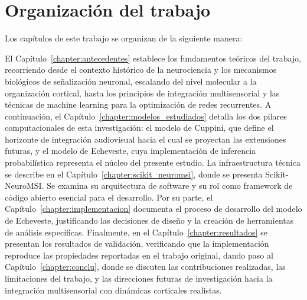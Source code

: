 
\section{Organización del trabajo}

Los capítulos de este trabajo se organizan de la siguiente manera:

El Capítulo~\ref{chapter:antecedentes} establece los fundamentos teóricos del trabajo, recorriendo desde el contexto histórico de la neurociencia y los mecanismos biológicos de señalización neuronal, escalando del nivel molecular a la organización cortical, hasta los principios de integración multisensorial y las técnicas de machine learning para la optimización de redes recurrentes. A continuación, el Capítulo~\ref{chapter:modelos_estudiados} detalla los dos pilares computacionales de esta investigación: el modelo de Cuppini, que define el horizonte de integración audiovisual hacia el cual se proyectan las extensiones futuras, y el modelo de Echeveste, cuya implementación de inferencia probabilística representa el núcleo del presente estudio. La infraestructura técnica se describe en el Capítulo~\ref{chapter:scikit_neuromsi}, donde se presenta Scikit-NeuroMSI. Se examina su arquitectura de software y su rol como framework de código abierto esencial para el desarrollo. Por su parte, el Capítulo~\ref{chapter:implementacion} documenta el proceso de desarrollo del modelo de Echeveste, justificando las decisiones de diseño y la creación de herramientas de análisis específicas. Finalmente, en el Capítulo~\ref{chapter:resultados} se presentan los resultados de validación, verificando que la implementación reproduce las propiedades reportadas en el trabajo original, dando paso al Capítulo~\ref{chapter:conclu}, donde se discuten las contribuciones realizadas, las limitaciones del trabajo, y las direcciones futuras de investigación hacia la integración multisensorial con dinámicas corticales realistas.